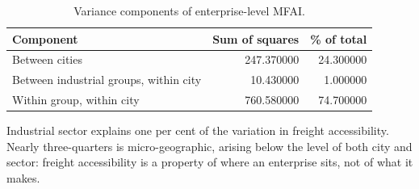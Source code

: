 \begin{table}[htbp]
\centering
\small
\caption{Variance components of enterprise-level MFAI.}
\label{tab:t10_variance_components}
\begin{tabular}{lrr}
\toprule
Component & Sum of squares & \% of total \\
\midrule
Between cities & 247.370000 & 24.300000 \\
Between industrial groups, within city & 10.430000 & 1.000000 \\
Within group, within city & 760.580000 & 74.700000 \\
\bottomrule
\end{tabular}
\begin{tablenotes}\footnotesize
\item Industrial sector explains one per cent of the variation in freight accessibility. Nearly three-quarters is micro-geographic, arising below the level of both city and sector: freight accessibility is a property of where an enterprise sits, not of what it makes.
\end{tablenotes}
\end{table}
